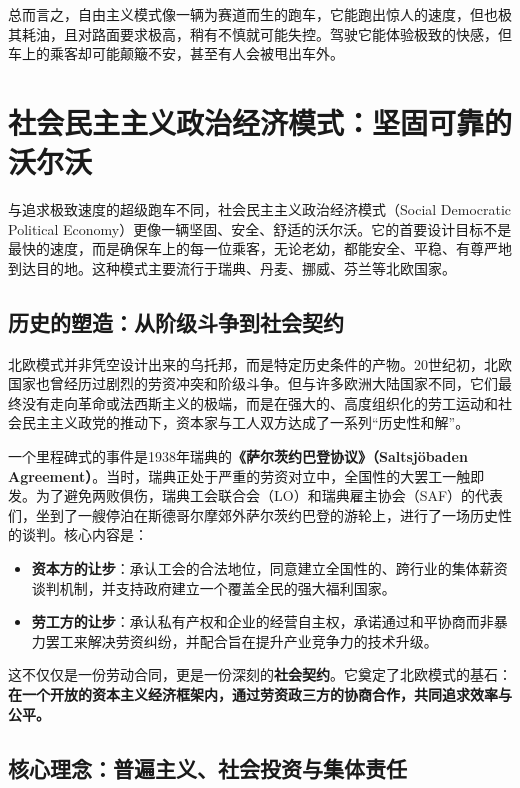 总而言之，自由主义模式像一辆为赛道而生的跑车，它能跑出惊人的速度，但也极其耗油，且对路面要求极高，稍有不慎就可能失控。驾驶它能体验极致的快感，但车上的乘客却可能颠簸不安，甚至有人会被甩出车外。

\section{社会民主主义政治经济模式：坚固可靠的沃尔沃}

与追求极致速度的超级跑车不同，社会民主主义政治经济模式（Social Democratic Political Economy）更像一辆坚固、安全、舒适的沃尔沃。它的首要设计目标不是最快的速度，而是确保车上的每一位乘客，无论老幼，都能安全、平稳、有尊严地到达目的地。这种模式主要流行于瑞典、丹麦、挪威、芬兰等北欧国家。

\subsection{历史的塑造：从阶级斗争到社会契约}

北欧模式并非凭空设计出来的乌托邦，而是特定历史条件的产物。20世纪初，北欧国家也曾经历过剧烈的劳资冲突和阶级斗争。但与许多欧洲大陆国家不同，它们最终没有走向革命或法西斯主义的极端，而是在强大的、高度组织化的劳工运动和社会民主主义政党的推动下，资本家与工人双方达成了一系列“历史性和解”。

一个里程碑式的事件是1938年瑞典的\textbf{《萨尔茨约巴登协议》（Saltsjöbaden Agreement）}。当时，瑞典正处于严重的劳资对立中，全国性的大罢工一触即发。为了避免两败俱伤，瑞典工会联合会（LO）和瑞典雇主协会（SAF）的代表们，坐到了一艘停泊在斯德哥尔摩郊外萨尔茨约巴登的游轮上，进行了一场历史性的谈判。核心内容是：

\begin{itemize}
\item \textbf{资本方的让步}：承认工会的合法地位，同意建立全国性的、跨行业的集体薪资谈判机制，并支持政府建立一个覆盖全民的强大福利国家。
\item \textbf{劳工方的让步}：承认私有产权和企业的经营自主权，承诺通过和平协商而非暴力罢工来解决劳资纠纷，并配合旨在提升产业竞争力的技术升级。
\end{itemize}

这不仅仅是一份劳动合同，更是一份深刻的\textbf{社会契约}。它奠定了北欧模式的基石：\textbf{在一个开放的资本主义经济框架内，通过劳资政三方的协商合作，共同追求效率与公平。}

\subsection{核心理念：普遍主义、社会投资与集体责任}


